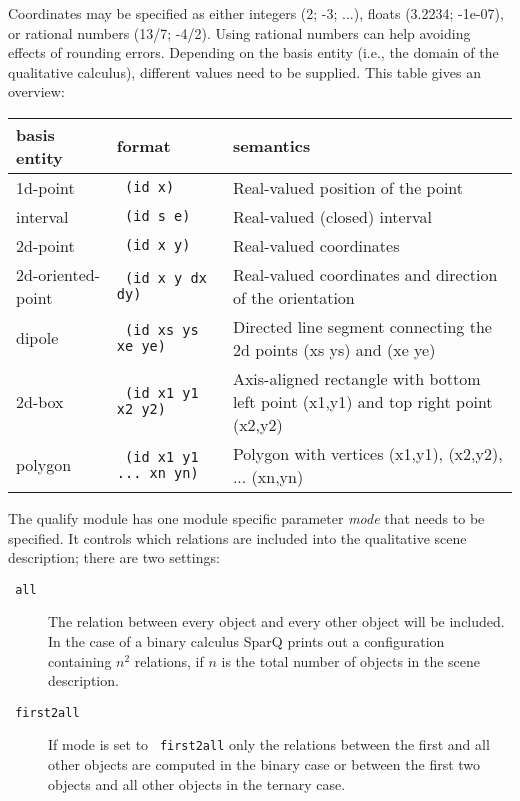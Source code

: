 \documentclass[headsepline]{scrreprt}
\theoremstyle{definition}
\newcommand{\engine}{SparQ}
\begin{document}
 Coordinates may be specified as either integers (2; -3; ...), floats (3.2234; -1e-07), or rational numbers (13/7; -4/2). Using rational numbers can help avoiding effects of rounding errors. Depending on the basis entity (i.e., the domain of the qualitative calculus), different values need to be supplied. This table gives an overview:

\begin{center}
\begin{tabular}{|llp{7cm}|}\hline
	{\bfseries basis entity} & {\bfseries format} & {\bfseries semantics}\\ \hline \hline
	1d-point & \texttt{ (id x)} & Real-valued position of the point \\
	interval & \texttt{ (id s e)} & Real-valued (closed) interval\\
	2d-point & \texttt{ (id x y)} & Real-valued coordinates \\
	2d-oriented-point & \texttt{ (id x y dx dy)} & Real-valued coordinates and direction of the orientation\\
	dipole & \texttt{ (id xs ys xe ye)} & Directed line segment connecting the 2d points (xs ys) and (xe ye)\\
	2d-box & \texttt{ (id x1 y1 x2 y2)} & Axis-aligned rectangle with bottom left point (x1,y1) and top right point (x2,y2)\\
	polygon & \texttt{ (id x1 y1 ... xn yn)} & Polygon with vertices (x1,y1), (x2,y2), ... (xn,yn)\\
	\hline
\end{tabular}
\end{center}

The qualify module has one module specific parameter {\em mode} that needs to be
specified. It controls which relations are included into the qualitative scene description; there are two settings:

\begin{description}
	\item[\texttt{ all}] The relation between every object and every other object will be included. In the case of a binary calculus \engine{} prints out a configuration containing $n^2$ relations, if $n$ is the total number of  objects in the scene description.

	\item[\texttt{ first2all}] If mode is set to \texttt{ first2all} only the relations between the first and all other objects are computed in the binary case or between the first two objects and all other objects in the ternary case.
\end{description}
\end{document}
